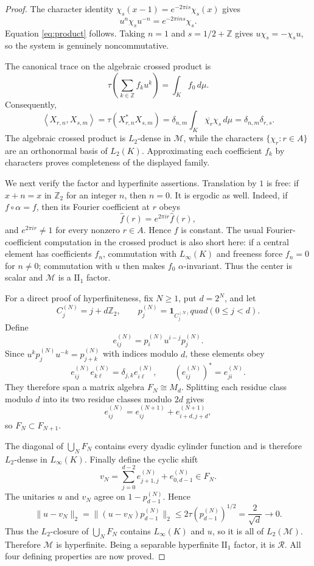 \documentclass[11pt]{article}
\theoremstyle{definition}
\theoremstyle{remark}
\newcommand{\Z}{\mathbb Z}
\newcommand{\R}{\mathcal R}
\newcommand{\M}{\mathcal M}
\newcommand{\1}{\mathbf 1}
\newcommand{\ip}[2]{\left\langle #1,#2\right\rangle}
\begin{document}
\begin{proof}
The character identity $\chi_s(x-1)=e^{-2\pi i s}\chi_s(x)$ gives
\[
 u^n\chi_su^{-n}=e^{-2\pi i ns}\chi_s.
\]
Equation \eqref{eq:product} follows.  Taking $n=1$ and $s=1/2+\Z$ gives
$u\chi_s=-\chi_su$, so the system is genuinely noncommutative.

The canonical trace on the algebraic crossed product is
\[
 \tau\!\left(\sum_{k\in\Z}f_k u^k\right)=\int_K f_0\,d\mu.
\]
Consequently,
\[
 \ip{X_{r,n}}{X_{s,m}}
 =\tau(X_{r,n}^*X_{s,m})
 =\delta_{n,m}\int_K\overline{\chi_r}\chi_s\,d\mu
 =\delta_{n,m}\delta_{r,s}.
\]
The algebraic crossed product is $L_2$-dense in $\M$, while the characters
$\{\chi_r:r\in A\}$ are an orthonormal basis of $L_2(K)$.  Approximating each
coefficient $f_k$ by characters proves completeness of the displayed family.

We next verify the factor and hyperfinite assertions.  Translation by $1$ is
free: if $x+n=x$ in $\Z_2$ for an integer $n$, then $n=0$.  It is ergodic as
well.  Indeed, if $f\circ\alpha=f$, then its Fourier coefficient at $r$ obeys
\[
 \widehat f(r)=e^{2\pi i r}\widehat f(r),
\]
and $e^{2\pi i r}\ne1$ for every nonzero $r\in A$.  Hence $f$ is constant.
The usual Fourier-coefficient computation in the crossed product is also
short here: if a central element has coefficients $f_n$, commutation with
$L_\infty(K)$ and freeness force $f_n=0$ for $n\ne0$; commutation with $u$
then makes $f_0$ $\alpha$-invariant.  Thus the center is scalar and $\M$ is a
$\mathrm{II}_1$ factor.

For a direct proof of hyperfiniteness, fix $N\ge1$, put $d=2^N$, and let
\[
 C_j^{(N)}=j+d\Z_2,\qquad p_j^{(N)}=\1_{C_j^{(N)}}quad(0\le j<d).
\]
Define
\[
 e_{ij}^{(N)}=p_i^{(N)}u^{i-j}p_j^{(N)}.
\]
Since $u^k p_j^{(N)}u^{-k}=p_{j+k}^{(N)}$ with indices modulo $d$, these
elements obey
\[
 e_{ij}^{(N)}e_{k\ell}^{(N)}=\delta_{j,k}e_{i\ell}^{(N)},
 \qquad (e_{ij}^{(N)})^*=e_{ji}^{(N)}.
\]
They therefore span a matrix algebra $F_N\cong M_d$.  Splitting each residue
class modulo $d$ into its two residue classes modulo $2d$ gives
\begin{equation}\label{eq:nesting}
 e_{ij}^{(N)}=e_{ij}^{(N+1)}+e_{i+d,j+d}^{(N+1)},
\end{equation}
so $F_N\subset F_{N+1}$.

The diagonal of $\bigcup_NF_N$ contains every dyadic cylinder function and
is therefore $L_2$-dense in $L_\infty(K)$.  Finally define the cyclic shift
\[
 v_N=\sum_{j=0}^{d-2}e_{j+1,j}^{(N)}+e_{0,d-1}^{(N)}\in F_N.
\]
The unitaries $u$ and $v_N$ agree on $1-p_{d-1}^{(N)}$.  Hence
\[
 \|u-v_N\|_2
 =\|(u-v_N)p_{d-1}^{(N)}\|_2
 \le 2\tau(p_{d-1}^{(N)})^{1/2}
 =\frac{2}{\sqrt d}\longrightarrow0.
\]
Thus the $L_2$-closure of $\bigcup_NF_N$ contains $L_\infty(K)$ and $u$, so it
is all of $L_2(\M)$.  Therefore $\M$ is hyperfinite.  Being a separable
hyperfinite $\mathrm{II}_1$ factor, it is $\R$.  All four defining properties
are now proved.
\end{proof}
\end{document}
